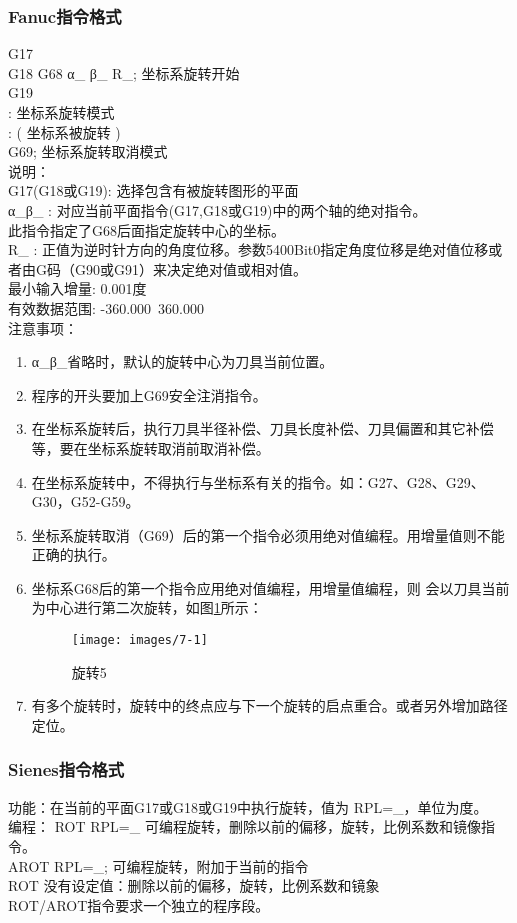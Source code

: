 \subsubsection{Fanuc指令格式}
G17\\
G18 G68 α\_ β\_ R\_; 坐标系旋转开始\\
G19\\
:                  坐标系旋转模式 \\
:                  ( 坐标系被旋转 )\\
G69;                坐标系旋转取消模式\\
说明：\\
G17(G18或G19): 选择包含有被旋转图形的平面\\
α\_β\_ :         对应当前平面指令(G17,G18或G19)中的两个轴的绝对指令。\\
此指令指定了G68后面指定旋转中心的坐标。\\
R\_    :         正值为逆时针方向的角度位移。参数5400Bit0指定角度位移是绝对值位移或者由G码（G90或G91）来决定绝对值或相对值。\\
最小输入增量: 0.001度\\
有效数据范围: -360.000~360.000\\
注意事项：
\begin{enumerate}[A、]
	\item α\_β\_省略时，默认的旋转中心为刀具当前位置。
\item 程序的开头要加上G69安全注消指令。
\item 在坐标系旋转后，执行刀具半径补偿、刀具长度补偿、刀具偏置和其它补偿等，要在坐标系旋转取消前取消补偿。
\item 在坐标系旋转中，不得执行与坐标系有关的指令。如：G27、G28、G29、G30，G52-G59。
\item  坐标系旋转取消（G69）后的第一个指令必须用绝对值编程。用增量值则不能正确的执行。
\item 坐标系G68后的第一个指令应用绝对值编程，用增量值编程，则    会以刀具当前为中心进行第二次旋转，如图\ref{旋转5}所示：
\begin{figure}[!hbtp]
	\centering	\texttt{[image: images/7-1]}
	\caption{旋转5} \label{旋转5}
\end{figure}
\item 有多个旋转时，旋转中的终点应与下一个旋转的启点重合。或者另外增加路径定位。
\end{enumerate}
\subsubsection{Sienes指令格式}
功能：在当前的平面G17或G18或G19中执行旋转，值为 RPL=\_，单位为度。\\
编程：    ROT RPL=\_  可编程旋转，删除以前的偏移，旋转，比例系数和镜像指令。\\
AROT RPL=\_; 可编程旋转，附加于当前的指令\\
ROT    没有设定值：删除以前的偏移，旋转，比例系数和镜象\\
ROT/AROT指令要求一个独立的程序段。

